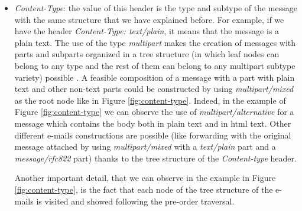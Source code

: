 \begin{itemize}
	\item\textit{Content-Type}: the value of this header is the type and subtype of the message with the same structure that we have explained before. For example, if we have the header \textit{Content-Type: text/plain}, it means that the message is a plain text. The use of the type \textit{multipart} makes the creation of messages with parts and subparts organized in a tree structure (in which leaf nodes can belong to any type and the rest of them can belong to any multipart subtype variety) possible \citep[Section 7.2]{rfc1341}. A feasible composition of a message with a part with plain text and other non-text parts could be constructed by using \textit{multipart/mixed} as the root node like in Figure \ref{fig:content-type}. Indeed, in the example of Figure \ref{fig:content-type} we can observe the use of \textit{multipart/alternative} for a message which contains the body both in plain text and in html text. Other different e-mails constructions are possible (like forwarding with the original message attached by using \textit{multipart/mixed} with a \textit{text/plain} part and a \textit{message/rfc822} part) thanks to the tree structure of the \textit{Content-type} header.
	
	Another important detail, that we can observe in the example in Figure \ref{fig:content-type}, is the fact that each node of the tree structure of the e-mails is visited and showed following the pre-order traversal.
	

\end{itemize}
